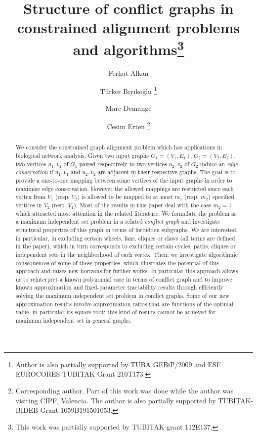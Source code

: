 \documentclass[final]{dmtcs-episciences}
\author{Ferhat Alkan\affiliationmark{1}
\and T\"{u}rker B{\i}y{\i}ko\u{g}lu\affiliationmark{2}
\thanks{Author is also partially supported by TUBA GEBiP/2009 and ESF EUROCORES TUBITAK Grant 210T173.}
\and Marc Demange\affiliationmark{3}
\and Cesim Erten\affiliationmark{4}
\thanks{Corresponding author. Part of this work was done while the author was visiting CIPF, Valencia. The author is also partially supported by TUBITAK-BIDEB Grant 1059B191501053.}}
\title{Structure of conflict graphs in constrained alignment  problems and algorithms\thanks{This work was partially supported by TUBITAK grant 112E137.}}
\affiliation{Division of Oncogenomics, The Netherlands Cancer Institute, Amsterdam, The Netherlands\\
2. Cadde, 12/9, 06500, Ankara, Turkey\\
School of  Science, RMIT University,
Melbourne, Australia\\
Computer Engineering, Antalya Bilim University, Antalya, Turkey}
\newcommand\mar[1]{\textcolor{black}{#1}}
\begin{document}




\maketitle

 \begin{abstract}
We consider the constrained graph alignment problem which has applications in biological network analysis. 
Given two input graphs $G_1=(V_1,E_1), G_2=(V_2,E_2)$, two vertices \mar{$u_1,v_1$ of $G_1$ paired respectively to two vertices $u_2,v_2$ of $G_2$}  induce an  \emph{ edge conservation} if \mar{$u_1,v_1$ and $u_2,v_2$ are adjacent in their respective graphs}. The goal is to provide a one-to-one mapping between \mar{some} vertices 
of the input graphs in order to maximize edge conservation. However the allowed mappings are restricted since each vertex from $V_1$ (resp. $V_2$) is allowed to be mapped to at most $m_1$ (resp. $m_2$) specified vertices in $V_2$ (resp. $V_1$). Most of the results in this paper deal with the case $m_2=1$ which attracted most attention in the related literature.
We formulate the problem as a maximum independent set problem in a related   {\em conflict graph} and investigate structural properties of this graph in terms of forbidden subgraphs. We are interested, in particular, in excluding certain wheels, fans, cliques or claws (all terms are defined in the paper), which in turn corresponds to excluding certain cycles, paths, cliques or independent sets in the neighborhood of each vertex. Then, we investigate algorithmic consequences  of some of these properties, which illustrates the potential of this approach and raises new horizons for further works. In particular this approach allows us to reinterpret a known polynomial case in terms of conflict graph and to improve known approximation and fixed-parameter tractability results through efficiently solving the maximum independent set problem in conflict graphs. Some of our new approximation results  involve  approximation ratios that are functions of the optimal value, in particular its square root; this  kind of results cannot be achieved for maximum independent set in general graphs.  
\end{abstract}

 
 
\end{document}
